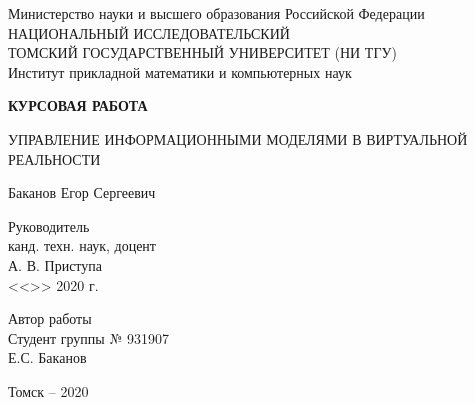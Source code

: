 ﻿\begin{titlepage}
    \begin{center}

        \begin{singlespace}
            \large
            Министерство науки и высшего образования Российской Федерации \\
            НАЦИОНАЛЬНЫЙ ИССЛЕДОВАТЕЛЬСКИЙ \\
            ТОМСКИЙ ГОСУДАРСТВЕННЫЙ УНИВЕРСИТЕТ (НИ ТГУ) \\
            Институт прикладной математики и компьютерных наук 
            \par
        \end{singlespace}
        \vspace{6cm}

        \begin{doublespace}
            {\bf
                КУРСОВАЯ РАБОТА
                \par
            }
            УПРАВЛЕНИЕ ИНФОРМАЦИОННЫМИ МОДЕЛЯМИ В ВИРТУАЛЬНОЙ РЕАЛЬНОСТИ
            \par
            Баканов Егор Сергеевич 
            \par
        \end{doublespace}
        \vspace{4cm}

        \hfill
        \begin{minipage}{5cm}
            \begin{singlespace}
                Руководитель \\
                канд. техн. наук, доцент \\
                А. В. Приступа \\
                <<\emptyunderline{.8cm}>>
                \emptyunderline{1.6cm}
                2020 г.
                \par
                Автор работы \\
                Студент группы № 931907 \\
                Е.С. Баканов
                \par
            \end{singlespace}
        \end{minipage}
        \vfill

        {\normalsize
            Томск -- 2020
            \par
        }
    \end{center}
\end{titlepage}